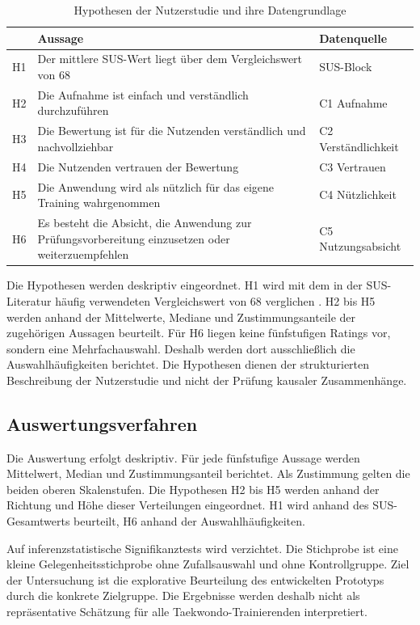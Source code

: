 \documentclass[intern]{cgMA}
\begin{document}
\begin{table}[h]
\centering
\small
\begin{tabular}{p{} p{} p{}}
\hline
& \textbf{Aussage} & \textbf{Datenquelle} \\ \hline
H1 & Der mittlere SUS-Wert liegt über dem Vergleichswert von 68 & SUS-Block \\
H2 & Die Aufnahme ist einfach und verständlich durchzuführen & C1 Aufnahme \\
H3 & Die Bewertung ist für die Nutzenden verständlich und nachvollziehbar & C2 Verständlichkeit \\
H4 & Die Nutzenden vertrauen der Bewertung & C3 Vertrauen \\
H5 & Die Anwendung wird als nützlich für das eigene Training wahrgenommen & C4 Nützlichkeit \\
H6 & Es besteht die Absicht, die Anwendung zur Prüfungsvorbereitung einzusetzen oder weiterzuempfehlen & C5 Nutzungsabsicht \\ \hline
\end{tabular}
\caption{Hypothesen der Nutzerstudie und ihre Datengrundlage}
\label{tab:eval_hyp}
\end{table}

Die Hypothesen werden deskriptiv eingeordnet. H1 wird mit dem in der SUS-Literatur häufig verwendeten Vergleichswert von 68 verglichen \cite{SauroLewis2016}. H2 bis H5 werden anhand der Mittelwerte, Mediane und Zustimmungsanteile der zugehörigen Aussagen beurteilt. Für H6 liegen keine fünfstufigen Ratings vor, sondern eine Mehrfachauswahl. Deshalb werden dort ausschließlich die Auswahlhäufigkeiten berichtet. Die Hypothesen dienen der strukturierten Beschreibung der Nutzerstudie und nicht der Prüfung kausaler Zusammenhänge.

\subsection{Auswertungsverfahren}
\label{sec:eval_auswertung}
Die Auswertung erfolgt deskriptiv. Für jede fünfstufige Aussage werden Mittelwert, Median und Zustimmungsanteil berichtet. Als Zustimmung gelten die beiden oberen Skalenstufen. Die Hypothesen H2 bis H5 werden anhand der Richtung und Höhe dieser Verteilungen eingeordnet. H1 wird anhand des SUS-Gesamtwerts beurteilt, H6 anhand der Auswahlhäufigkeiten.

Auf inferenzstatistische Signifikanztests wird verzichtet. Die Stichprobe ist eine kleine Gelegenheitsstichprobe ohne Zufallsauswahl und ohne Kontrollgruppe. Ziel der Untersuchung ist die explorative Beurteilung des entwickelten Prototyps durch die konkrete Zielgruppe. Die Ergebnisse werden deshalb nicht als repräsentative Schätzung für alle Taekwondo-Trainierenden interpretiert.
\end{document}
